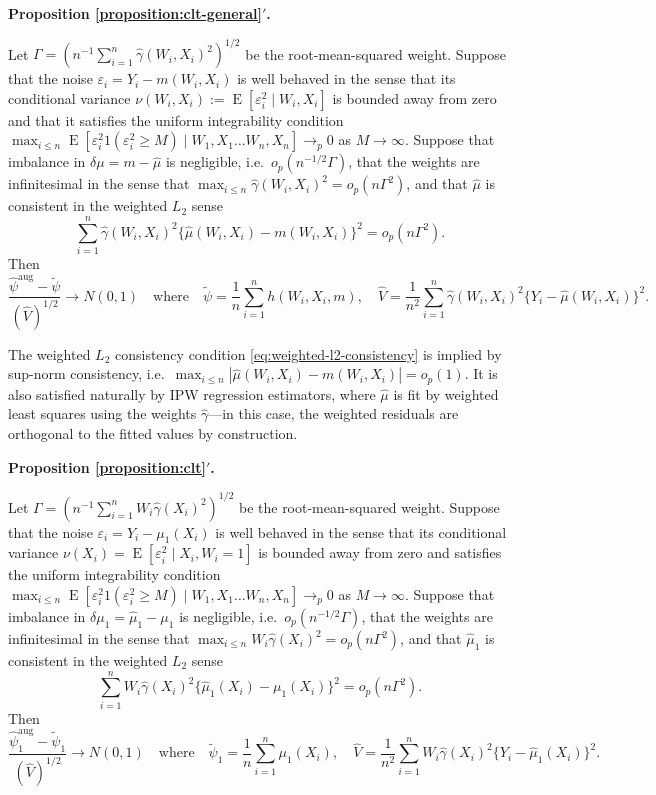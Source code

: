 \documentclass{article}
\newenvironment{propositionprime}[1]{%
  \par\medskip\noindent\textbf{Proposition #1$'$.}\itshape\space
}{%
  \par\medskip
}
\theoremstyle{definition}
\DeclareMathOperator{\E}{E}
\newcommand{\dm}{\delta \mu}
\newcommand{\hgamma}{\ensuremath{\hat\gamma}}
\newcommand{\aug}{\text{aug}}
\newcommand{\<}{\langle}
\renewcommand{\>}{\rangle}
\begin{document}
\begin{refsection}
\begin{propositionprime}{\ref{proposition:clt-general}}
\label{proposition:appendix-clt-general}
Let $\Gamma = (n^{-1}\sum_{i=1}^n \hgamma(W_i, X_i)^2)^{1/2}$ be the root-mean-squared weight. Suppose that the noise $\varepsilon_i = Y_i - m(W_i, X_i)$ is well behaved in the sense that its conditional variance $\nu(W_i, X_i) := \E[\varepsilon_i^2 \mid W_i, X_i]$ is bounded away from zero and that it satisfies the uniform integrability condition
$\max_{i \le n} \E[\varepsilon_i^2 1(\varepsilon_i^2 \ge M) \mid W_1,X_1 \ldots W_n, X_n] \to_p 0$ as $M \to \infty$. Suppose that imbalance in $\dm = m - \hat \mu$ is negligible, i.e.\ $o_p(n^{-1/2}\Gamma)$, that the weights are infinitesimal in the sense that $\max_{i \le n} \hgamma(W_i, X_i)^2 = o_p(n\Gamma^2)$, and that $\hat \mu$ is consistent in the weighted $L_2$ sense
\begin{equation}
\label{eq:weighted-l2-consistency}
\sum_{i=1}^n \hgamma(W_i, X_i)^2 \{\hat \mu(W_i, X_i) - m(W_i, X_i)\}^2 = o_p(n\Gamma^2).
\end{equation}
Then
\[
\frac{\hat\psi^{\aug} - \tilde\psi}{(\hat V)^{1/2}} \to N(0,1) \quad \text{where} \quad \tilde\psi = \frac{1}{n}\sum_{i=1}^n h(W_i, X_i, m), \quad \hat V = \frac{1}{n^2}\sum_{i=1}^n \hgamma(W_i, X_i)^2 \{Y_i - \hat \mu(W_i, X_i)\}^2.
\]
\end{propositionprime}

The weighted $L_2$ consistency condition \eqref{eq:weighted-l2-consistency} is implied by sup-norm consistency, i.e.\ $\max_{i \le n} |\hat \mu(W_i, X_i) - m(W_i, X_i)| = o_p(1)$. It is also satisfied naturally by IPW regression estimators, where $\hat \mu$ is fit by weighted least squares using the weights $\hgamma$---in this case, the weighted residuals are orthogonal to the fitted values by construction.

\begin{propositionprime}{\ref{proposition:clt}}
\label{proposition:appendix-clt}
Let $\Gamma = (n^{-1}\sum_{i=1}^n W_i \hgamma(X_i)^2)^{1/2}$ be the root-mean-squared weight. Suppose that the noise $\varepsilon_i = Y_i - \mu_1(X_i)$ is well behaved in the sense that its conditional variance $\nu(X_i) = \E[\varepsilon_i^2 \mid X_i, W_i=1]$ is bounded away from zero and satisfies the uniform integrability condition $\max_{i \le n} \E[\varepsilon_i^2 1(\varepsilon_i^2 \ge M) \mid W_1, X_1 \ldots W_n, X_n] \to_p 0$ as $M \to \infty$. Suppose that imbalance in $\delta\mu_1 = \hat \mu_1 - \mu_1$ is negligible, i.e.\ $o_p(n^{-1/2}\Gamma)$, that the weights are infinitesimal in the sense that $\max_{i \le n} W_i \hgamma(X_i)^2 = o_p(n\Gamma^2)$, and that $\hat \mu_1$ is consistent in the weighted $L_2$ sense
\[
\sum_{i=1}^n W_i \hgamma(X_i)^2 \{\hat \mu_1(X_i) - \mu_1(X_i)\}^2 = o_p(n\Gamma^2).
\]
Then
\[
\frac{\hat\psi_1^{\aug} - \tilde\psi_1}{(\hat V)^{1/2}} \to N(0,1) \quad \text{where} \quad \tilde\psi_1 = \frac{1}{n}\sum_{i=1}^n \mu_1(X_i), \quad \hat V = \frac{1}{n^2}\sum_{i=1}^n W_i \hgamma(X_i)^2 \{Y_i - \hat \mu_1(X_i)\}^2.
\]
\end{propositionprime}


\end{refsection}
\end{document}
